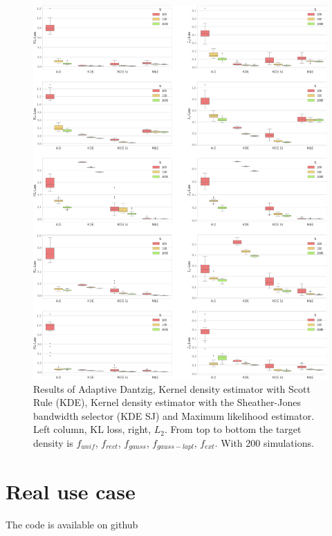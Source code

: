 \begin{figure}
    \hspace{-2cm}
    \includegraphics[width=1.2\textwidth]{./TeX_files/full_results.png}
    \caption{Results of Adaptive Dantzig, Kernel density estimator with Scott Rule (KDE), Kernel density estimator with the Sheather-Jones bandwidth selector (KDE SJ) and Maximum likelihood estimator. Left column, KL loss, right, $L_2$. From top to bottom the target density is $f_{unif}$, $f_{rect}$, $f_{gauss}$, $f_{gauss-lapl}$, $f_{ext}$. With 200 simulations.  }
    \label{fig:full_res}
\end{figure}
\section{Real use case}

The code is available on github